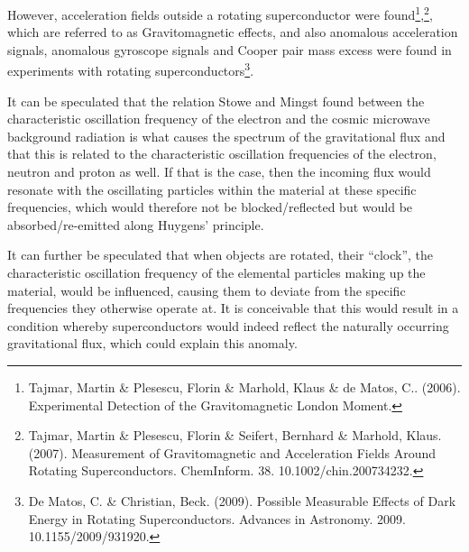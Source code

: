 \documentclass{article}
\begin{document}
However, acceleration fields outside a rotating superconductor were found\footnote{ Tajmar, Martin \& Plesescu, Florin
\& Marhold, Klaus \& de Matos, C.. (2006). Experimental Detection of the Gravitomagnetic London Moment. \par
},\footnote{ Tajmar, Martin \& Plesescu, Florin \& Seifert, Bernhard \& Marhold, Klaus. (2007). Measurement of
Gravitomagnetic and Acceleration Fields Around Rotating Superconductors. ChemInform. 38. 10.1002/chin.200734232. \par
}, which are referred to as Gravitomagnetic effects, and also anomalous acceleration signals, anomalous gyroscope
signals and Cooper pair mass excess were found in experiments with rotating superconductors\footnote{ De Matos, C. \&
Christian, Beck. (2009). Possible Measurable Effects of Dark Energy in Rotating Superconductors. Advances in Astronomy.
2009. 10.1155/2009/931920. }. 

It can be speculated that the relation Stowe and Mingst found between the characteristic oscillation frequency of the
electron and the cosmic microwave background radiation is what causes the spectrum of the gravitational flux and that
this is related to the characteristic oscillation frequencies of the electron, neutron and proton as well. If that is
the case, then the incoming flux would resonate with the oscillating particles within the material at these specific
frequencies, which would therefore not be blocked/reflected but would be absorbed/re-emitted along Huygens' principle.

It can further be speculated that when objects are rotated, their ``clock'', the characteristic oscillation frequency of
the elemental particles making up the material, would be influenced, causing them to deviate from the specific
frequencies they otherwise operate at. It is conceivable that this would result in a condition whereby superconductors
would indeed reflect the naturally occurring gravitational flux, which could explain this anomaly.
\end{document}
